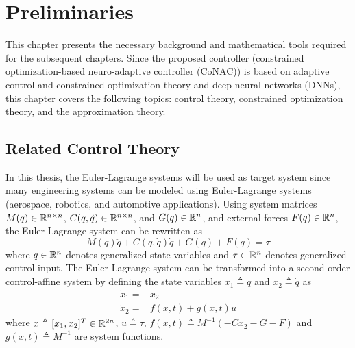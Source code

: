
\chapter{Preliminaries} \label{chapter2}

This chapter presents the necessary background and mathematical tools required for the subsequent chapters.
Since the proposed controller (constrained optimization-based neuro-adaptive controller (CoNAC)) is based on adaptive control and constrained optimization theory and deep neural networks (DNNs), this chapter covers the following topics: control theory, constrained optimization theory, and the approximation theory.

\section{Related Control Theory} \label{chap2:sec:ctrl}


In this thesis, the Euler-Lagrange systems will be used as target system since many engineering systems can be modeled using Euler-Lagrange systems (\eg aerospace, robotics, and automotive applications).
Using system matrices $M(q)\in\mathbb{R}^{n\times n}$, $C(q,\dot{q})\in\mathbb{R}^{n\times n}$, and $G(q)\in\mathbb{R}^{n}$, and external forces $F(q)\in\mathbb{R}^n$, the Euler-Lagrange system can be rewritten as
\begin{equation}
    M(q)\ddot{q} + C(q,\dot{q})\dot{q} + G(q) +F(q)= \tau
\end{equation}
where $q\in\mathbb{R}^n$ denotes generalized state variables and $\tau\in\mathbb{R}^n$ denotes generalized control input.
The Euler-Lagrange system can be transformed into a second-order control-affine system by defining the state variables $x_1\triangleq q$ and $x_2\triangleq \dot q$ as
\begin{equation}
  \begin{aligned}
    \dot x_1 =& x_2\\
    \dot x_2 =& f(x,t)+g(x,t)u
  \end{aligned}
\end{equation}
where $x\triangleq [x_1,x_2]^T\in\mathbb{R}^{2n}$, $u\triangleq \tau$, $f(x,t)\triangleq M^{-1}(-Cx_2-G-F)$ and $g(x,t)\triangleq M^{-1}$ are system functions.

